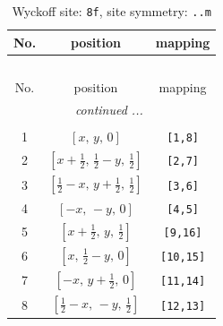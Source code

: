 \documentclass[fleqn,8pt]{jsarticle}
\begin{document}
\begin{longtable}{ccc}
\caption{Wyckoff site: {\tt 8f}, site symmetry: {\tt ..m}}
 \\
 \hline \hline
No. & position & mapping \\ \hline \endfirsthead

\multicolumn{2}{l}{\tablename\ \thetable{}} \\
 \hline \hline
No. & position & mapping \\ \hline \endhead

 \hline \hline
\multicolumn{2}{r}{\footnotesize\it continued ...} \\ \endfoot

 \hline \hline
\multicolumn{2}{r}{} \\ \endlastfoot

1 & $\left[ x,\, y,\, 0 \right]$ & {\tt [1,8]} \\ \hline
2 & $\left[ x + \frac{1}{2},\, \frac{1}{2} - y,\, \frac{1}{2} \right]$ & {\tt [2,7]} \\ \hline
3 & $\left[ \frac{1}{2} - x,\, y + \frac{1}{2},\, \frac{1}{2} \right]$ & {\tt [3,6]} \\ \hline
4 & $\left[ - x,\, - y,\, 0 \right]$ & {\tt [4,5]} \\ \hline
5 & $\left[ x + \frac{1}{2},\, y,\, \frac{1}{2} \right]$ & {\tt [9,16]} \\ \hline
6 & $\left[ x,\, \frac{1}{2} - y,\, 0 \right]$ & {\tt [10,15]} \\ \hline
7 & $\left[ - x,\, y + \frac{1}{2},\, 0 \right]$ & {\tt [11,14]} \\ \hline
8 & $\left[ \frac{1}{2} - x,\, - y,\, \frac{1}{2} \right]$ & {\tt [12,13]} \\
\end{longtable}
\renewcommand{\arraystretch}{1.2}
\end{document}
